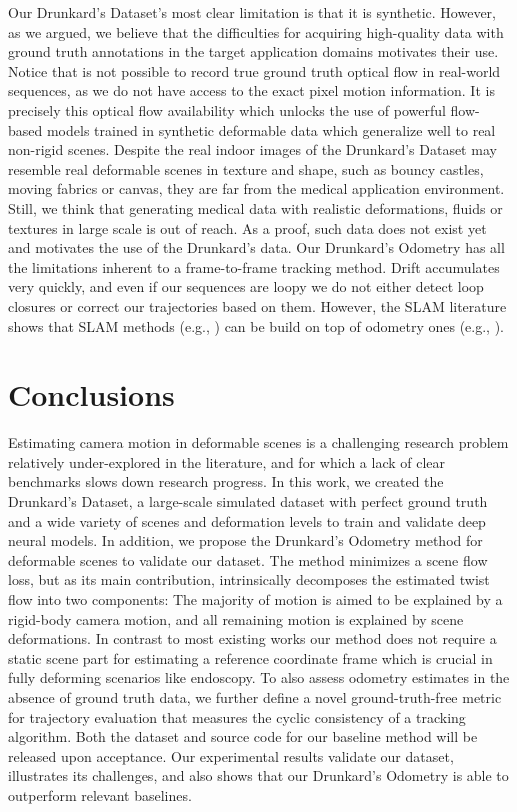 \documentclass{article}
\newcommand{\boldparagraph}[1]{\vspace{0.0em}\noindent{\bf #1}}
\begin{document}
\boldparagraph{Limitations.}
\label{sec:limitations}
Our Drunkard's Dataset's most clear limitation is that it is synthetic. However, as we argued, we believe that the difficulties for acquiring high-quality data with ground truth annotations in the target application domains motivates their use. Notice that is not possible to record true ground truth optical flow in real-world sequences, as we do not have access to the exact pixel motion information. It is precisely this optical flow availability which unlocks the use of powerful flow-based models trained in synthetic deformable data which generalize well to real non-rigid scenes. Despite the real indoor images of the Drunkard's Dataset may resemble real deformable scenes in texture and shape, such as bouncy castles, moving fabrics or canvas, they are far from the medical application environment. Still, we think that generating medical data with realistic deformations, fluids or textures in large scale is out of reach. As a proof, such data does not exist yet and motivates the use of the Drunkard's data.
Our Drunkard's Odometry has all the limitations inherent to a frame-to-frame tracking method. Drift accumulates very quickly, and even if our sequences are loopy we do not either detect loop closures or correct our trajectories based on them. However, the SLAM literature shows that SLAM methods (e.g., \cite{gao2018ldso}) can be build on top of odometry ones (e.g., \cite{engel2017direct}). 


\section{Conclusions}  \label{sec:conclusions}
Estimating camera motion in deformable scenes is a challenging research problem relatively under-explored in the literature, and for which a lack of clear benchmarks slows down research progress.
In this work, we created the Drunkard's Dataset, a large-scale simulated dataset with perfect ground truth and a wide variety of scenes and deformation levels to train and validate deep neural models.
In addition, we propose the Drunkard's Odometry method for deformable scenes to validate our dataset.
The method minimizes a scene flow loss, but as its main contribution, intrinsically decomposes the estimated twist flow into two components: The majority of motion is aimed to be explained by a rigid-body camera motion, and all remaining motion is explained by scene deformations.
In contrast to most existing works our method does not require a static scene part for estimating a reference coordinate frame which is crucial in fully deforming scenarios like endoscopy.
To also assess odometry estimates in the absence of ground truth data, we further define a novel ground-truth-free metric for trajectory evaluation that measures the cyclic consistency of a tracking algorithm.
Both the dataset and source code for our baseline method will be released upon acceptance.
Our experimental results validate our dataset, illustrates its challenges, and also shows that our Drunkard's Odometry is able to outperform relevant baselines. 
\end{document}
